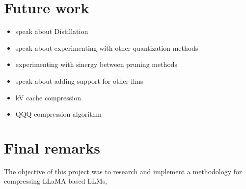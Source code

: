 \section{Future work}
\begin{itemize}
    \item speak about Distillation
    \item speak about experimenting with other quantization methods
    \item experimenting with sinergy between pruning methods
    \item speak about adding support for other llms
    \item kV cache compression
    \item QQQ compression algorithm
\end{itemize}
\section{Final remarks} \label{future_work}
The objective of this project was to research and implement a methodology for compressing LLaMA based LLMs, 